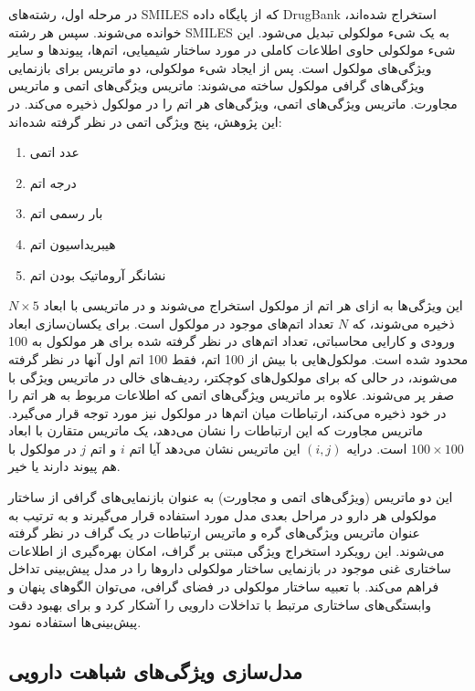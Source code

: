 در مرحله اول، رشته‌های SMILES که از پایگاه داده DrugBank استخراج شده‌اند، خوانده می‌شوند. سپس هر رشته SMILES به یک شیء مولکولی تبدیل می‌شود. این شیء مولکولی حاوی اطلاعات کاملی در مورد ساختار شیمیایی، اتم‌ها، پیوندها و سایر ویژگی‌های مولکول است. پس از ایجاد شیء مولکولی، دو ماتریس برای بازنمایی ویژگی‌های گرافی مولکول ساخته می‌شوند: ماتریس ویژگی‌های اتمی و ماتریس مجاورت. ماتریس ویژگی‌های اتمی، ویژگی‌های هر اتم را در مولکول ذخیره می‌کند. در این پژوهش، پنج ویژگی اتمی در نظر گرفته شده‌اند:

\begin{enumerate}
	\item عدد اتمی
	\item درجه اتم 
	\item بار رسمی اتم
	\item هیبریداسیون اتم
	\item نشانگر آروماتیک بودن اتم
\end{enumerate}

این ویژگی‌ها به ازای هر اتم از مولکول استخراج می‌شوند و در ماتریسی با ابعاد $N \times 5$ ذخیره می‌شوند، که $N$ تعداد اتم‌های موجود در مولکول است. برای یکسان‌سازی ابعاد ورودی و کارایی محاسباتی، تعداد اتم‌های در نظر گرفته شده برای هر مولکول به 100 محدود شده است. مولکول‌هایی با بیش از 100 اتم، فقط 100 اتم اول آنها در نظر گرفته می‌شوند، در حالی که برای مولکول‌های کوچکتر، ردیف‌های خالی در ماتریس ویژگی با صفر پر می‌شوند. علاوه بر ماتریس ویژگی‌های اتمی که اطلاعات مربوط به هر اتم را در خود ذخیره می‌کند، ارتباطات میان اتم‌ها در مولکول نیز مورد توجه قرار می‌گیرد. ماتریس مجاورت که این ارتباطات را نشان می‌دهد، یک ماتریس متقارن با ابعاد $100 \times 100$ است. درایه $(i,j)$ این ماتریس نشان می‌دهد آیا اتم $i$ و اتم $j$ در مولکول با هم پیوند دارند یا خیر.

این دو ماتریس (ویژگی‌های اتمی و مجاورت) به عنوان بازنمایی‌های گرافی از ساختار مولکولی هر دارو در مراحل بعدی مدل مورد استفاده قرار می‌گیرند و به ترتیب به عنوان ماتریس ویژگی‌های گره و ماتریس ارتباطات در یک گراف در نظر گرفته می‌شوند. این رویکرد استخراج ویژگی مبتنی بر گراف، امکان بهره‌گیری از اطلاعات ساختاری غنی موجود در بازنمایی ساختار مولکولی داروها را در مدل پیش‌بینی تداخل فراهم می‌کند. با تعبیه ساختار مولکولی در فضای گرافی، می‌توان الگوهای پنهان و وابستگی‌های ساختاری مرتبط با تداخلات دارویی را آشکار کرد و برای بهبود دقت پیش‌بینی‌ها استفاده نمود.

\subsection{مدل‌سازی ویژگی‌های شباهت دارویی}



